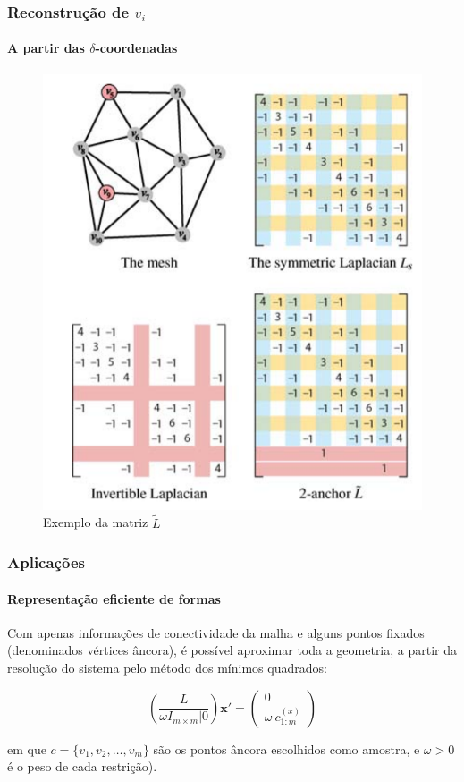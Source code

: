 \begin{frame}
\frametitle{Reconstrução de $v_i$}
\framesubtitle{A partir das $\delta$-coordenadas}

\begin{figure}
	\includegraphics[width=0.5\linewidth]{img/lrestricao.png}
	\caption{Exemplo da matriz $\tilde{L}$ \cite{Sorkine2006}}
\end{figure}
\end{frame}

\begin{frame}
\frametitle{Aplicações}
\framesubtitle{Representação eficiente de formas}

Com apenas informações de conectividade da malha e alguns pontos fixados (denominados vértices âncora), é possível aproximar toda a geometria, a partir da resolução do sistema pelo método dos mínimos quadrados:

\begin{equation}\label{eq:sisrecover}
	\left( \frac{L}{\omega I_{m \times m} | 0} \right) \mathbf{x'} = \begin{pmatrix}
		0\\
		\omega\ c_{1:m}^{(x)}
	\end{pmatrix}
\end{equation}

em que $c = \{v_1, v_2, \dots, v_m\}$ são os pontos âncora escolhidos como amostra, e $\omega > 0$ é o peso de cada restrição).

\end{frame}

